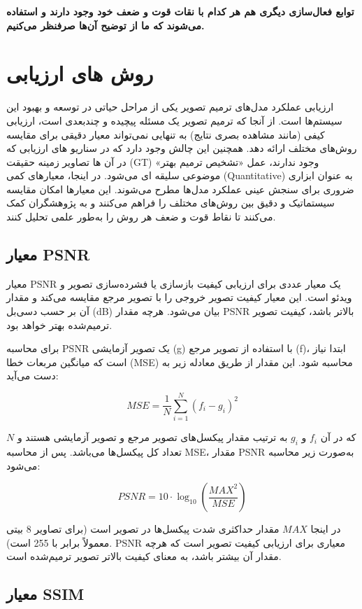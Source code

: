 \textbf{توابع فعال‌سازی دیگری هم هر کدام با نقات قوت و ضعف خود وجود دارند و استفاده می‌شوند که ما از توضیح آن‌ها صرفنظر می‌کنیم.}



\section{روش های ارزیابی}

ارزیابی عملکرد مدل‌های ترمیم تصویر یکی از مراحل حیاتی در توسعه و بهبود این سیستم‌ها است. از آنجا که ترمیم تصویر یک مسئله پیچیده و چندبعدی است، ارزیابی کیفی (مانند مشاهده بصری نتایج) به تنهایی نمی‌تواند معیار دقیقی برای مقایسه روش‌های مختلف ارائه دهد. همچنین این چالش وجود دارد که در سناریو های ارزیابی که در آن ها تصاویر زمینه حقیقت (GT) وجود ندارند، عمل «تشخیص ترمیم بهتر» موضوعی سلیقه ای می‌شود. در اینجا، معیارهای کمی (Quantitative) به عنوان ابزاری ضروری برای سنجش عینی عملکرد مدل‌ها مطرح می‌شوند. این معیارها امکان مقایسه سیستماتیک و دقیق بین روش‌های مختلف را فراهم می‌کنند و به پژوهشگران کمک می‌کنند تا نقاط قوت و ضعف هر روش را به‌طور علمی تحلیل کنند.
\subsection{معیار PSNR}
معیار PSNR یک معیار عددی برای ارزیابی کیفیت بازسازی یا فشرده‌سازی تصویر و ویدئو است. این معیار کیفیت تصویر خروجی را با تصویر مرجع مقایسه می‌کند و مقدار آن بر حسب دسی‌بل (dB) بیان می‌شود. هرچه مقدار PSNR بالاتر باشد، کیفیت تصویر ترمیم‌شده بهتر خواهد بود.

برای محاسبه PSNR یک تصویر آزمایشی (g) با استفاده از تصویر مرجع (f)، ابتدا نیاز است که میانگین مربعات خطا (MSE) محاسبه شود. این مقدار از طریق معادله زیر به دست می‌آید:

\[
MSE = \frac{1}{N} \sum_{i=1}^{N} (f_i - g_i)^2
\]

که در آن $f_i$ و $g_i$ به ترتیب مقدار پیکسل‌های تصویر مرجع و تصویر آزمایشی هستند و $N$ تعداد کل پیکسل‌ها می‌باشد. پس از محاسبه MSE، مقدار PSNR به‌صورت زیر محاسبه می‌شود:

\begin{equation}
	PSNR = 10 \cdot \log_{10}\left(\frac{MAX^2}{MSE}\right)
\end{equation}

در اینجا $MAX$ مقدار حداکثری شدت پیکسل‌ها در تصویر است (برای تصاویر 8 بیتی معمولاً برابر با 255 است). PSNR معیاری برای ارزیابی کیفیت تصویر است که هرچه مقدار آن بیشتر باشد، به معنای کیفیت بالاتر تصویر ترمیم‌شده است.

\subsection{معیار SSIM}


